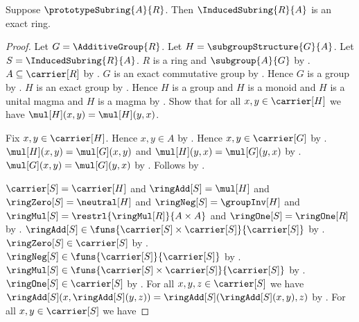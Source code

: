 \begin{theorem}\label{spike_induced_subring_is_exact}
    Suppose $\prototypeSubring{A}{R}$.
    Then $\InducedSubring{R}{A}$ is an exact ring.
\end{theorem}
\begin{proof}
    Let $G=\AdditiveGroup{R}$.
    Let $H=\subgroupStructure{G}{A}$.
    Let $S=\InducedSubring{R}{A}$.
    $R$ is a ring and $\subgroup{A}{G}$ by
        .
    $A\subseteq\carrier[R]$ by
        .
    $G$ is an exact commutative group by
        .
    Hence $G$ is a group by .
    $H$ is an exact group by
        .
    Hence $H$ is a group and $H$ is a monoid and
        $H$ is a unital magma and $H$ is a magma by
        .
    Show that for all $x,y\in\carrier[H]$ we have
        $\mul[H](x,y)=\mul[H](y,x)$.
    \begin{subproof}
        Fix $x,y\in\carrier[H]$.
        Hence $x,y\in A$ by .
        Hence $x,y\in\carrier[G]$ by
            .
        $\mul[H](x,y)=\mul[G](x,y)$ and
            $\mul[H](y,x)=\mul[G](y,x)$ by
            .
        $\mul[G](x,y)=\mul[G](y,x)$ by
            .
        Follows by \auto.
    \end{subproof}
    $\carrier[S]=\carrier[H]$ and $\ringAdd[S]=\mul[H]$ and
        $\ringZero[S]=\neutral[H]$ and
        $\ringNeg[S]=\groupInv[H]$ and
        $\ringMul[S]=\restrl{\ringMul[R]}{A\times A}$ and
        $\ringOne[S]=\ringOne[R]$ by
        .
    $\ringAdd[S]\in
        \funs{\carrier[S]\times\carrier[S]}{\carrier[S]}$ by
        .
    $\ringZero[S]\in\carrier[S]$ by .
    $\ringNeg[S]\in\funs{\carrier[S]}{\carrier[S]}$ by
        .
    $\ringMul[S]\in
        \funs{\carrier[S]\times\carrier[S]}{\carrier[S]}$ by
        .
    $\ringOne[S]\in\carrier[S]$ by
        .
    For all $x,y,z\in\carrier[S]$ we have
        $\ringAdd[S](x,\ringAdd[S](y,z))
            =\ringAdd[S](\ringAdd[S](x,y),z)$ by
        .
    For all $x,y\in\carrier[S]$ we have

\end{proof}
